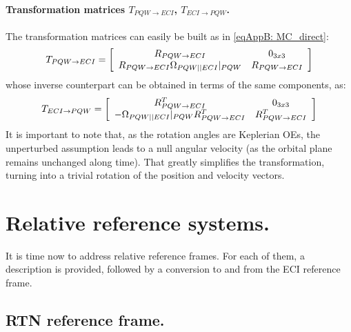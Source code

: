 			\paragraph{Transformation matrices $T_{PQW\rightarrow ECI}$, $T_{ECI\rightarrow PQW}$. \\}
			\indent The transformation matrices can easily be built as in \eqref{eqAppB: 	MC_direct}:
			\[
			 T_{PQW\to ECI} = \left[\begin{array}{cc}
	R_{PQW\to ECI} & 0_{3x3} \\
	R_{PQW\to ECI} \Omega_{PQW \vert \vert ECI}\rvert_{PQW} & R_{PQW\to ECI}
	\end{array}\right]
			\]
			\noindent whose inverse counterpart can be obtained in terms of the same components, as:
			\[
			 T_{ECI\to PQW} = \left[\begin{array}{cc}
	R_{PQW\to ECI}^T & 0_{3x3} \\
	-\Omega_{PQW \vert \vert ECI}\rvert_{PQW} R_{PQW\to ECI}^T & R_{PQW\to ECI}^T
	\end{array}\right]
			\]
			\indent It is important to note that, as the rotation angles are Keplerian OEs, the unperturbed assumption leads to a null angular velocity (as the orbital plane remains unchanged along time). That greatly simplifies the transformation, turning into a trivial rotation of the position and velocity vectors.
		
\section{Relative reference systems.}
%
\indent It is time now to address relative reference frames. For each of them, a description is provided, followed by a conversion to and from the ECI reference frame. 
%
	\subsection{RTN reference frame.} \label{sec: RTN}
